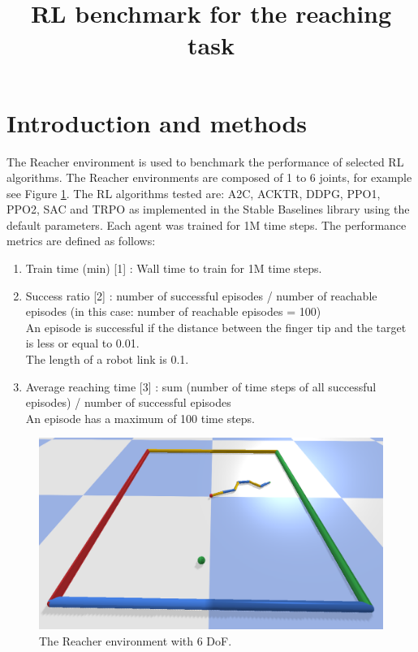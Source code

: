 \documentclass{article}
\title{RL benchmark for the reaching task}
\date{}
\begin{document}
\maketitle


\section{Introduction and methods}

The Reacher environment is used to benchmark the performance of selected RL algorithms. The Reacher environments are composed of 1 to 6 joints, for example see Figure \ref{reacher6dof}. The RL algorithms tested are: A2C, ACKTR, DDPG, PPO1, PPO2, SAC and TRPO as implemented in the Stable Baselines library using the default parameters. Each agent was trained for 1M time steps. The performance metrics are defined as follows:

\begin{enumerate}
  \item Train time (min) [1] : Wall time to train for 1M time steps.
  \item Success ratio [2] : number of successful episodes / number of reachable episodes (in this case: number of reachable episodes = 100) \\ 
An episode is successful if the distance between the finger tip and the target is less or equal to 0.01. \\ 
The length of a robot link is 0.1.
  \item Average reaching time [3] : sum (number of time steps of all successful episodes) /  number of successful episodes \\ 
An episode has a maximum of 100 time steps.
\end{enumerate}



\begin{figure}[H]
    \centering
    \includegraphics[width=\textwidth]{reacher6dof.png}
\caption{The Reacher environment with 6 DoF.}
\label{reacher6dof}
\end{figure}
\end{document}

